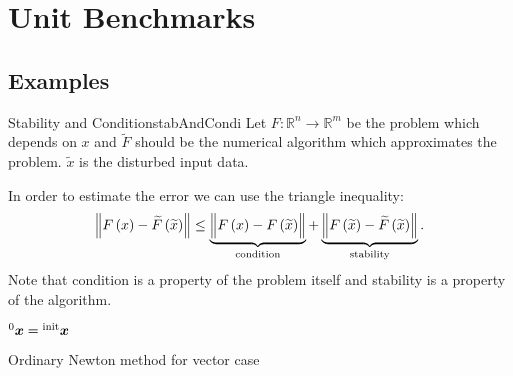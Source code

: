 \chapter{Unit Benchmarks}




\section{Examples}
\begin{myDefinition}{Stability and Condition}{stabAndCondi}
	Let $F : \mathbb{R}^n \to \mathbb{R}^m$ be the problem which depends on $x$ and $\widetilde F$ should be the numerical algorithm which approximates the problem. $\widetilde x$ is the disturbed input data.
	
	In order to estimate the error we can use the triangle inequality:
	\begin{align}
	\left\| F\left(x\right) - \widetilde F\left(\widetilde x\right) \right\| \leq \underbrace{\left\| \vphantom{\widetilde F} F\left(x\right) - F\left(\widetilde x\right) \right\|}_\mathrm{condition}  + \underbrace{\left\| F\left(\widetilde x\right) - \widetilde F\left(\widetilde x\right) \right\|}_\mathrm{stability} \text{.}
	\end{align}
	Note that condition is a property of the problem itself and stability is a property of the algorithm.
\end{myDefinition}


\begin{algorithm}[!htb]
	\DontPrintSemicolon
	\LinesNumbered
	
	${^{0}}\vectorsym{x} = {^{\mathrm{init} }}\vectorsym{x}$
	
	
	\caption{Ordinary Newton method for vector case}
	\label{alg:ordNewton}
\end{algorithm}

